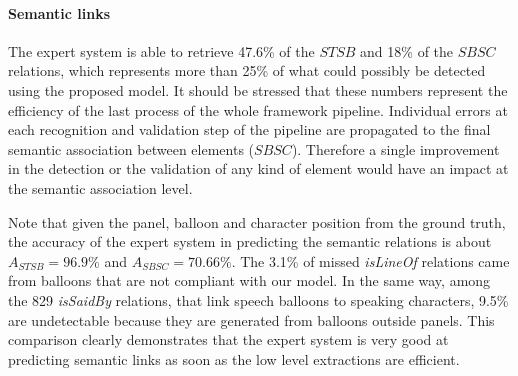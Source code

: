 
\paragraph{Semantic links} %
\label{sec:semantic_links_evaluation}

The expert system is able to retrieve 47.6\% of the $STSB$ and 18\% of the $SBSC$ relations, which represents more than 25\% of what could possibly be detected using the proposed model.
It should be stressed that these numbers represent the efficiency of the last process of the whole framework pipeline.
Individual errors at each recognition and validation step of the pipeline are propagated to the final semantic association between elements ($SBSC$).
Therefore a single improvement in the detection or the validation of any kind of element would have an impact at the semantic association level.

Note that given the panel, balloon and character position from the ground truth, the accuracy of the expert system in predicting the semantic relations is about $A_{STSB}=96.9\%$ and $A_{SBSC}=70.66\%$.
The 3.1\% of missed \emph{isLineOf} relations came from balloons that are not compliant with our model.
In the same way, among the 829 \emph{isSaidBy} relations, that link speech balloons to speaking characters, 9.5\% are undetectable because they are generated from balloons outside panels.
This comparison clearly demonstrates that the expert system is very good at predicting semantic links as soon as the low level extractions are efficient.










